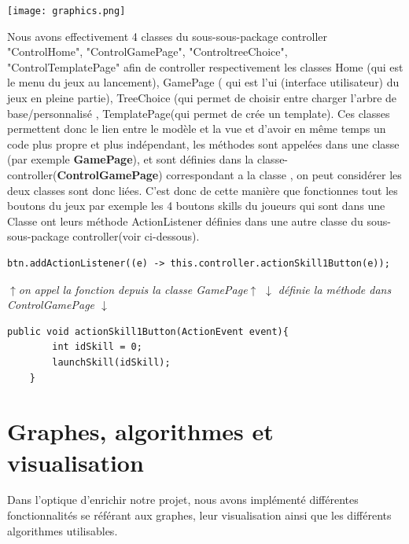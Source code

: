\documentclass[12pt]{article}
\begin{document}
\begin{center}
    \texttt{[image: graphics.png]}
\end{center}
Nous avons effectivement 4 classes du sous-sous-package controller "ControlHome", "ControlGamePage", "ControltreeChoice", "ControlTemplatePage" afin de controller respectivement les classes Home (qui est le menu du jeux au lancement), GamePage ( qui est l'ui (interface utilisateur) du jeux en pleine partie), TreeChoice (qui permet de choisir entre charger l'arbre de base/personnalisé , TemplatePage(qui permet de crée un template).\newline
Ces classes permettent donc le lien entre le modèle et la vue et d'avoir en même temps un code plus propre et plus indépendant, les méthodes sont appelées dans une classe (par exemple \textbf{GamePage}), et sont définies dans la classe-controller(\textbf{ControlGamePage}) correspondant a la classe , on peut considérer les deux classes sont donc liées.\newline
C'est donc de cette manière que fonctionnes tout les boutons du jeux par exemple les 4 boutons  skills du joueurs qui sont dans une Classe ont leurs méthode ActionListener définies dans une autre classe du sous-sous-package controller(voir ci-dessous).
\begin{lstlisting}
btn.addActionListener((e) -> this.controller.actionSkill1Button(e));
\end{lstlisting}
  	\textit{$\uparrow$on appel la fonction depuis la classe GamePage$\uparrow$}\newline 
\textit{$\downarrow$ définie la méthode dans ControlGamePage                                        $\downarrow$}
\begin{lstlisting}
public void actionSkill1Button(ActionEvent event){
        int idSkill = 0;
        launchSkill(idSkill);
    }
\end{lstlisting}


\section{Graphes, algorithmes et visualisation}
Dans l'optique d'enrichir notre projet, nous avons implémenté différentes fonctionnalités se référant aux graphes, leur visualisation ainsi que les différents algorithmes utilisables.
\end{document}

